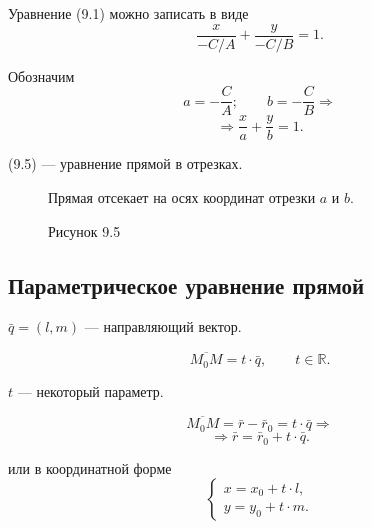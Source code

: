 \documentclass[12pt,a4paper]{article}
\newcommand{\vq}{\bar q}
\newcommand{\vr}{\bar r}
\newcommand{\vrzero}{\bar r_0}
\begin{document}
Уравнение (9.1) можно записать в виде
$$
\frac{x}{-C/A}+\frac{y}{-C/B}=1.
$$

Обозначим
$$
a=-\frac CA;\qquad b=-\frac CB
\Rightarrow
$$
\begin{equation}
  \Rightarrow \frac xa+\frac yb=1. \tag{9.5}
\end{equation}

(9.5) --- уравнение прямой в отрезках.

\begin{figure}[H]
  \centering
  \begin{minipage}{0.4\textwidth}
    \centering
    \caption*{Рисунок 9.5}
  \end{minipage}%
  \begin{minipage}{0.55\textwidth}
    Прямая отсекает на осях координат отрезки $a$ и $b$.
  \end{minipage}
\end{figure}

\subsection*{\textbf{Параметрическое уравнение прямой}}

$\vq=(l,m)$ --- направляющий вектор.

$$
\overline{M_0M}=t\cdot \vq,\qquad t\in\mathbb R.
$$

$t$ --- некоторый параметр.

$$
\overline{M_0M}=\vr-\vrzero=t\cdot \vq
\Rightarrow
$$
\begin{equation}
  \Rightarrow \vr=\vrzero+t\cdot \vq. \tag{9.6}
\end{equation}

или в координатной форме
\begin{equation}
  \begin{cases}
    x=x_0+t\cdot l,\\
    y=y_0+t\cdot m.
  \end{cases}
  \tag{9.7}
\end{equation}
\end{document}
